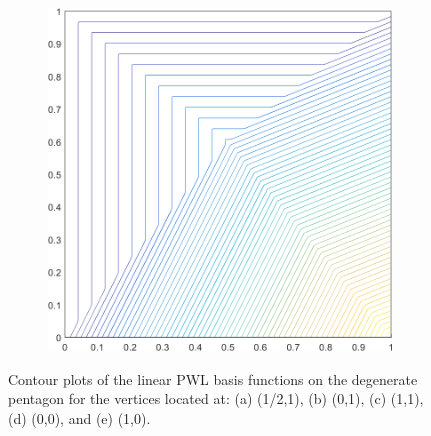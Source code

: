 \begin{figure}
\begin{subfigure}[b]{0.39\textwidth}
		\caption{}
	\end{subfigure}
	\hspace{1.5cm}
	\begin{subfigure}[b]{0.39\textwidth}
		\centering
		\includegraphics[width=\textwidth]{figures/sec_BF/deg_square_PWLD1_contour_b2.png}
		\caption{}
	\end{subfigure}
\caption{Contour plots of the linear PWL basis functions on the degenerate pentagon for the vertices located at: (a) (1/2,1), (b) (0,1), (c) (1,1), (d) (0,0), and (e) (1,0).}
\label{fig::2D_PWLD1_deg_square_basis_functions}
\end{figure}

